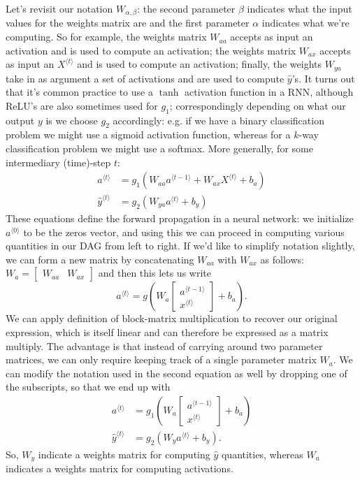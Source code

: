 \documentclass[12pt]{article}
\begin{document}
Let's revisit our notation $W_{\alpha, \beta}$: the second parameter $\beta$ indicates what the input values for the weights matrix are and the first parameter $\alpha$ indicates what we're computing. So for example, the weights matrix $W_{aa}$ accepts as input an activation and is used to compute an activation; the weights matrix $W_{ax}$ accepts as input an
$X^{\langle t \rangle}$ and is used to compute an activation; finally, the weights $W_{ya}$ take in as argument a set of activations and are used to compute $\hat y$'s. It turns out that it's common practice to use a $\tanh$ activation function in a RNN, although ReLU's are also sometimes used for $g_1$; correspondingly depending on what our output $y$ is we choose $g_2$ accordingly: e.g. if we have a binary classification problem  we might use a sigmoid activation function, whereas for a $k$-way classification problem we might use a softmax. More generally, for some intermediary (time)-step $t$:
\begin{align*}
  a^{\langle t \rangle} &= g_1\left(W_{aa} a^{\langle t - 1 \rangle} + W_{ax}   X^{\langle t \rangle} + b_a\right) \\
  \hat y^{\langle t \rangle} &= g_2\left(W_{ya} a^{\langle t \rangle} + b_y \right)
\end{align*}
These equations define the forward propagation in a neural network: we initialize $a^{\langle 0 \rangle}$ to be the zeros vector, and using this we can proceed in computing various quantities in our DAG from left to right. If we'd like to simplify notation slightly, we can form a new matrix by concatenating $W_{aa}$ with $W_{ax}$ as follows:
$W_a = \begin{bmatrix} W_{aa} & W_{ax} \end{bmatrix}$ and then this lets us write
\[
a^{\langle t \rangle} = g\left(W_a \begin{bmatrix} a^{\langle t - 1 \rangle} \\ x^{\langle t \rangle} \end{bmatrix} + b_a \right).
\]
We can apply definition of block-matrix multiplication to recover our original expression, which is itself linear and can therefore be expressed as a matrix multiply. The advantage is that instead of carrying around two parameter matrices, we can only require keeping track of a single parameter matrix $W_a$. We can modify the notation used in the second equation as well by dropping one of the subscripts, so that we end up with
\begin{align*}
a^{\langle t \rangle} &= g_1\left(W_a \begin{bmatrix} a^{\langle t - 1 \rangle}   \\ x^{\langle t \rangle} \end{bmatrix} + b_a \right) \\
\hat y^{\langle t \rangle} &= g_2 \left(W_y a^{\langle t \rangle} + b_y\right).
\end{align*}
So, $W_y$ indicate a weights matrix for computing $\hat y$ quantities, whereas $W_a$ indicates a weights matrix for computing activations.
\end{document}
